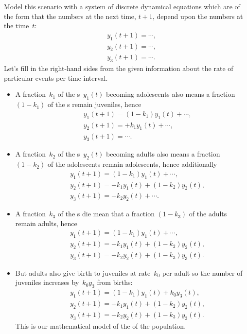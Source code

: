 Model this scenario with a system of discrete dynamical equations which are of the form that the numbers at the next time, \(t+1\), depend upon the numbers at the time~\(t\):
\begin{eqnarray*}&&
{y_1(t+1)}=\cdots,
\\&&{y_2(t+1)}=\cdots,
\\&&{y_3(t+1)}=\cdots.
\end{eqnarray*}
Let's fill in the right-hand sides from the given information about the rate of particular events per time interval.
\begin{itemize}
\item A fraction~\(k_1\) of the s~\(y_1(t)\) becoming adolescents also means a fraction \((1-k_1)\) of the s remain juveniles, hence
\begin{eqnarray*}&&
{y_1(t+1)}=(1-k_1)y_1(t)+\cdots,
\\&&{y_2(t+1)}=+k_1y_1(t)+\cdots,
\\&&{y_3(t+1)}=\cdots.
\end{eqnarray*}
\item A fraction~\(k_2\) of the s~\(y_2(t)\) becoming adults also means a fraction \((1-k_2)\)  of the adolescents remain adolescents, hence additionally
\begin{eqnarray*}&&
{y_1(t+1)}=(1-k_1)y_1(t)+\cdots,
\\&&{y_2(t+1)}=+k_1y_1(t)+(1-k_2)y_2(t),
\\&&{y_3(t+1)}=+k_2y_2(t)+\cdots.
\end{eqnarray*}
\item A fraction~\(k_3\) of the s die mean that a fraction \((1-k_3)\) of the adults remain adults, hence
\begin{eqnarray*}&&
{y_1(t+1)}=(1-k_1)y_1(t)+\cdots,
\\&&{y_2(t+1)}=+k_1y_1(t)+(1-k_2)y_2(t),
\\&&{y_3(t+1)}=+k_2y_2(t)+(1-k_3)y_3(t).
\end{eqnarray*}
\item But adults also give birth to juveniles at rate~\(k_0\) per adult so the number of juveniles increases by~\(k_0y_3\) from births:
\begin{eqnarray*}&&
{y_1(t+1)}=(1-k_1)y_1(t)+k_0y_3(t),
\\&&{y_2(t+1)}=+k_1y_1(t)+(1-k_2)y_2(t),
\\&&{y_3(t+1)}=+k_2y_2(t)+(1-k_3)y_3(t).
\end{eqnarray*}
This is our mathematical model of the  of the {population}.
\end{itemize}

